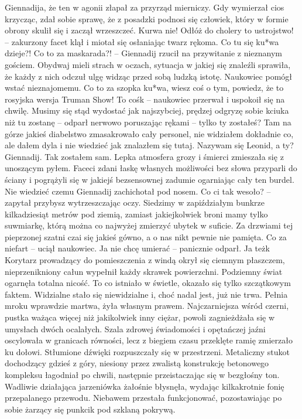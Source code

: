 \documentclass[../MAIN.tex]{subfiles}
\begin{document}
Giennadija, że ten w agonii złapał za przyrząd mierniczy. Gdy wymierzał cios krzycząc, zdał sobie sprawę, że z posadzki podnosi się człowiek, który w formie obrony skulił się i zaczął wrzeszczeć.
% 
\sx Kurwa nie! Odłóż do cholery to ustrojstwo! -- zakurzony facet klął i miotał się osłaniając twarz rękoma. 
\xx Co tu się ku*wa dzieje?! Co to za maskarada?! -- Giennadij rzucił na przywitanie z nieznanym gościem.
\qd
Obydwaj mieli strach w oczach, sytuacja w jakiej się znaleźli sprawiła, że każdy z nich odczuł ulgę widząc przed sobą ludzką istotę. Naukowiec pomógł wstać nieznajomemu. 
% 
\sx Co to za szopka ku*wa, wiesz coś o tym, powiedz, że to rosyjska wersja Truman Show! To coś\3k -- naukowiec przerwał i uspokoił się na chwilę. 
\xx Musimy się stąd wydostać jak najszybciej, prędzej odgryzę sobie kciuka niż tu zostanę -- odparł nerwowo poruszając rękami -- tylko ty zostałeś? Tam na górze jakieś diabelstwo zmasakrowało cały personel, nie widziałem dokładnie co, ale dałem dyla i nie wiedzieć jak znalazłem się tutaj. Nazywam się Leonid, a ty? 
\xx Giennadij. Tak zostałem sam. 
\qd
Lepka atmosfera grozy i śmierci zmieszała się z unoszącym pyłem. Faceci zdani łaskę własnych możliwości bez słowa przyparli do ściany i pogrążyli się w jakiejś bezsensownej zadumie ogarniając cały ten burdel. Nie wiedzieć czemu Giennadij zachichotał pod nosem. 
% 
\sx Co ci tak wesoło? -- zapytał przybysz wytrzeszczając oczy. 
\xx Siedzimy w zapiździałym bunkrze kilkadziesiąt metrów pod ziemią, zamiast jakiejkolwiek broni mamy tylko suwmiarkę, którą można co najwyżej zmierzyć ubytek w suficie. Za drzwiami tej pieprzonej szatni czai się jakieś gówno, a o nas nikt pewnie nie pamięta. Co za niefart -- uciął naukowiec. 
\xx Ja nie chcę umierać -- panicznie odparł. 
\xx Ja też\3k
\qd
%
\vfil
{}
% 
Korytarz prowadzący do pomieszczenia z windą okrył się ciemnym płaszczem, nieprzenikniony całun wypełnił każdy skrawek powierzchni. Podziemny świat ogarnęła totalna nicość. To co istniało w świetle, okazało się tylko szczątkowym faktem. Widzialne stało się niewidzialne i, choć nadal jest, już nie trwa. Pełnia mroku wprawdzie martwa, żyła własnym prawem. Najczarniejsza wśród czerni, pustka ważąca więcej niż jakikolwiek inny ciężar, powoli zagnieżdżała się w umysłach dwóch ocalałych. Szala zdrowej świadomości i opętańczej jaźni oscylowała w granicach równości, lecz z biegiem czasu przeklęte ramię zmierzało ku dołowi. Stłumione dźwięki rozpuszczały się w przestrzeni. Metaliczny stukot dochodzący gdzieś z góry, niesiony przez zwalistą konstrukcję betonowego kompleksu łagodniał po chwili, następnie przeistaczając się w bezgłośny ton. Wadliwie działająca jarzeniówka żałośnie błysnęła, wydając kilkakrotnie fonię przepalanego przewodu. Niebawem przestała funkcjonować, pozostawiając po sobie żarzący się punkcik pod 
szklaną pokrywą. 
\end{document}
